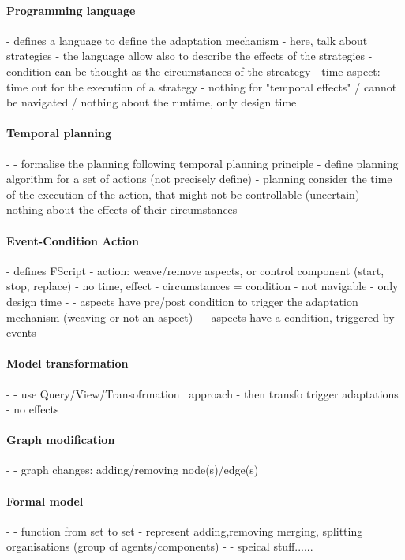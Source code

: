 \paragraph{Programming language}
- \cite{DBLP:journals/jss/ChengG12} defines a language to define the adaptation mechanism
	- here, talk about strategies
	- the language allow also to describe the effects of the strategies 
	- condition can be thought as the circumstances of the streategy
	- time aspect: time out for the execution of a strategy
	- nothing for "temporal effects" / cannot be navigated / nothing about the runtime, only design time
	
\paragraph{Temporal planning}
- \cite{DBLP:conf/aaai/CimattiMR15}
	- formalise the planning following temporal planning principle
	- define planning algorithm for a set of actions (not precisely define)
	- planning consider the time of the execution of the action, that might not be controllable (uncertain)
	- nothing about the effects of their circumstances
	 
\paragraph{Event-Condition Action}
- \cite{DBLP:conf/soco/DavidL06} defines FScript
	- action: weave/remove aspects, or control component (start, stop, replace)
 	- no time, effect
 	- circumstances = condition
 	- not navigable
 	- only design time
- \cite{DBLP:conf/icws/CharfiDM09}
	- aspects have pre/post condition to trigger the adaptation mechanism (weaving or not an aspect) 
- \cite{DBLP:journals/scp/ParraBCD11}
	- aspects have a condition, triggered by events
	
\paragraph{Model transformation}
- \cite{DBLP:conf/icse/ChenPYNZ14}
	- use Query/View/Transofrmation~\cite{QVT:Spec} approach
	- then transfo trigger adaptations
	- no effects
	
\paragraph{Graph modification}
- \cite{DBLP:journals/tse/KramerM90}
	- graph changes: adding/removing node(s)/edge(s)
	
\paragraph{Formal model}
- \cite{DBLP:journals/taas/WeynsHH10}
	- function from set to set
	- represent adding,removing merging, splitting organisations (group of agents/components)
- \cite{DBLP:conf/icse/BartelsK11}
	- speical stuff......
	

